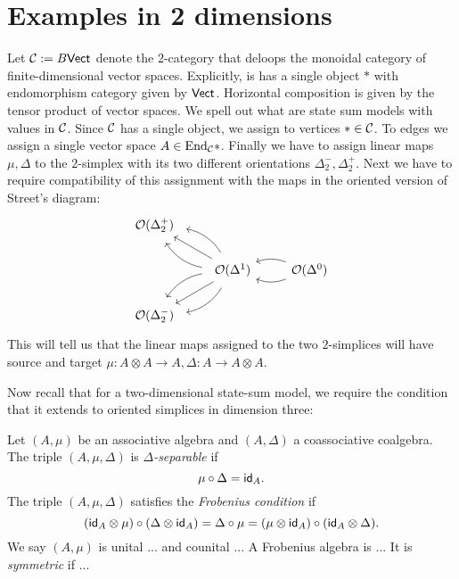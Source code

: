 \section{Examples in 2 dimensions}

Let $\mathcal{C} := B\mathsf{Vect}$ denote the $2$-category that deloops the monoidal category of finite-dimensional vector spaces.
Explicitly, is has a single object $*$ with endomorphism category given by $\mathsf{Vect}$.
Horizontal composition is given by the tensor product of vector spaces.
We spell out what are state sum models with values in $\mathcal{C}$.
Since $\mathcal{C}$ has a single object, we assign to vertices $* \in \mathcal{C}$.
To edges we assign a single vector space $A \in \mathrm{End}_{\mathcal{C}} *$.
Finally we have to assign linear maps $\mu, \Delta$ to the $2$-simplex with its two different orientations $\Delta^-_2, \Delta^+_2$.
Next we have to require compatibility of this assignment with the maps in the oriented version of Street's diagram:
\[
\begin{tikzcd}
\oriental(\Delta^+_2)    & &
\\
& \oriental(\Delta^1) \ar[lu, bend right = 25, shorten <=0.2cm, shorten >=0.2cm] \ar[lu, bend left = 25, shorten <=0.2cm, shorten >=0.2cm] \ar[lu] \ar[ld, bend right = 25, shorten <=0.2cm, shorten >=0.2cm] \ar[ld, bend left = 25, shorten <=0.2cm, shorten >=0.2cm] \ar[ld] & \oriental(\Delta^0) \ar[l, bend left=20] \ar[l, bend right=20]
\\
\oriental(\Delta^-_2) & &
\end{tikzcd}
\]
This will tell us that the linear maps assigned to the two $2$-simplices will have source and target $\mu: A \otimes A \to A, \Delta: A \to A \otimes A$.

Now recall that for a two-dimensional state-sum model, we require the condition that it extends to oriented simplices in dimension three:

\begin{definition}
	Let $(A, \mu)$ be an associative algebra and $(A,\Delta)$ a coassociative coalgebra.
	The triple $(A,\mu,\Delta)$ is \textit{$\Delta$-separable} if
	\[
	\mu \circ \Delta = \mathsf{id}_A.
	\]
	The triple $(A,\mu,\Delta)$ satisfies the \textit{Frobenius condition} if
	\[
	(\mathsf{id}_A \otimes \mu) \circ (\Delta \otimes \mathsf{id}_A) = \Delta \circ \mu = (\mu \otimes \mathsf{id}_A) \circ (\mathsf{id}_A \otimes \Delta).
	\]
	We say $(A,\mu)$ is unital ... and counital ...
	A Frobenius algebra is ...
	It is \textit{symmetric} if ...
\end{definition}

\begin{theorem}

\end{theorem}

